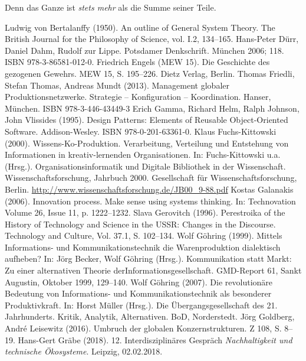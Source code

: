 \documentclass[12pt,a4paper]{article}
\begin{document}
Denn das Ganze ist \emph{stets mehr} als die Summe seiner Teile.

\begin{thebibliography}{xxx}
 Ludwig von Bertalanffy (1950). An outline of General
  System Theory. The British Journal for the Philosophy of Science, vol. I.2,
  134–165.
 Hans-Peter Dürr, Daniel Dahm, Rudolf zur Lippe. Potsdamer
  Denkschrift.  München 2006; 118. ISBN 978-3-86581-012-0.
 Friedrich Engels (MEW 15). Die Geschichte des gezogenen
  Gewehrs.  MEW 15, S. 195--226. Dietz Verlag, Berlin.
 Thomas Friedli, Stefan Thomas, Andreas Mundt (2013).
  Management globaler Produktionsnetzwerke. Strategie – Konfiguration –
  Koordination. Hanser, München. ISBN 978-3-446-43449-3
 Erich Gamma, Richard Helm, Ralph Johnson, John Vlissides
  (1995). Design Patterns: Elements of Reusable Object-Oriented Software.
  Addison-Wesley. ISBN 978-0-201-63361-0.
 Klaus Fuchs-Kittowski (2000).  Wissens-Ko-Produktion.
  Verarbeitung, Verteilung und Entstehung von Informationen in
  kreativ-lernenden Organisationen. In: Fuchs-Kittowski u.a.  (Hrsg.).
  Organisationsinformatik und Digitale Bibliothek in der
  Wissenschaft. Wissenschaftsforschung, Jahrbuch 2000. Gesellschaft für
  Wissenschaftsforschung, Berlin.
  \url{http://www.wissenschaftsforschung.de/JB00_9-88.pdf}
 Kostas Galanakis (2006).  Innovation process. Make
  sense using systems thinking.  In: Technovation Volume 26, Issue 11,
  p. 1222--1232.
 Slava Gerovitch (1996). Perestroika of the History of
  Technology and Science in the USSR: Changes in the Discourse. Technology and
  Culture, Vol. 37.1, S. 102--134.
 Wolf Göhring (1999).  Mittels Informations- und
  Kommunikationstechnik die Warenproduktion dialektisch aufheben? In: Jörg
  Becker, Wolf Göhring (Hrsg.).  Kommunikation statt Markt: Zu einer
  alternativen Theorie derInformationsgesellschaft.  GMD-Report 61, Sankt
  Augustin, Oktober 1999, 129–140.
 Wolf Göhring (2007). Die revolutionäre Bedeutung von
  Informations- und Kommunikationstechnik als besonderer Produktivkraft. In:
  Horst Müller (Hrsg.).  Die Übergangsgesellschaft des 21. Jahrhunderts.
  Kritik, Analytik, Alternativen.  BoD, Norderstedt.
 Jörg Goldberg, André Leisewitz (2016). Umbruch der
  globalen Konzernstrukturen. Z 108, S. 8--19.
 Hans-Gert Gräbe (2018).  12. Interdisziplinäres Gespräch
  \emph{Nachhaltigkeit und technische Ökosysteme}. Leipzig, 02.02.2018.\\ 

\end{thebibliography}
\end{document}
